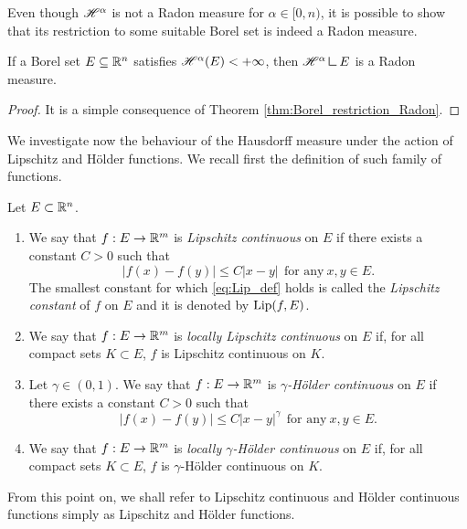 Even though $\mathscr{H}^{\alpha}$ is not a Radon measure for $\alpha \in [0, n)$, it is possible to show that its restriction to some suitable Borel set is indeed a Radon measure.

\begin{proposition} \label{prop:Haus_Radon_res}
If a Borel set $E \subseteq \mathbb{R}^n$ satisfies $\mathscr{H}^{\alpha}(E) < + \infty$, then $\Haus{\alpha} \res E$ is a Radon measure.
\end{proposition}
\begin{proof}
It is a simple consequence of Theorem \ref{thm:Borel_restriction_Radon}. 
\end{proof}

We investigate now the behaviour of the Hausdorff measure under the action of Lipschitz and H\"older functions. We recall first the definition of such family of functions.

\begin{definition} Let $E \subset \mathbb{R}^{n}$.
\begin{enumerate}[(1)]
\item We say that $f : E \to \mathbb{R}^{m}$ is {\em Lipschitz continuous} on $E$ if there exists a constant $C > 0$ such that
\begin{equation} \label{eq:Lip_def}
|f(x) - f(y)| \le C |x - y| \ \ \text{for any} \ x, y \in E.
\end{equation}
The smallest constant for which \eqref{eq:Lip_def} holds is called the {\em Lipschitz constant} of $f$ on $E$ and it is denoted by $\operatorname{Lip}(f, E)$. 
\item We say that $f : E \to \mathbb{R}^{m}$ is {\em locally Lipschitz continuous} on $E$ if, for all compact sets $K \subset E$, $f$ is Lipschitz continuous on $K$.
\item Let $\gamma \in (0,1)$. We say that $f: E \to \mathbb{R}^{m}$ is {\em $\gamma$-H\"older continuous} on $E$ if there exists a constant $C > 0$ such that
\begin{equation} \label{eq:Holder_def}
|f(x) - f(y)| \le C |x - y|^{\gamma} \ \ \text{for any} \ x, y \in E.
\end{equation}
\item We say that $f : E \to \mathbb{R}^{m}$ is {\em locally $\gamma$-H\"older continuous} on $E$ if, for all compact sets $K \subset E$, $f$ is $\gamma$-H\"older continuous on $K$.
\end{enumerate}
\end{definition}

From this point on, we shall refer to Lipschitz continuous and H\"older continuous functions simply as Lipschitz and H\"older functions. 

